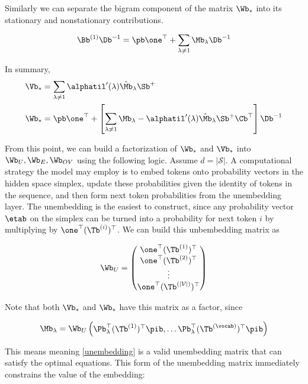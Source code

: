 \documentclass{article}
\begin{document}
Similarly we can separate the bigram component of the matrix $\Wb_*$ into its stationary and nonstationary contributions. 

\begin{equation}
    \Bb^{(1)}\Db^{-1} = \pb \one^\top + \sum_{\lambda\neq1}\Mb_\lambda\Db^{-1}
\end{equation}

In summary, 
\begin{align}
    \Vb_* &= \sum_{\lambda\neq 1} \alphatil'(\lambda) \hat{\Mb}_\lambda \Sb^+ \\
    \Wb_* &= \pb\one^\top + \left[\sum_{\lambda \neq 1} \Mb_\lambda - \alphatil'(\lambda) \hat{\Mb}_\lambda \Sb^{+}\Cb^\top\right] \Db^{-1}
\end{align}

From this point, we can build a factorization of $\Wb_*$ and $\Vb_*$ into $\Wb_U, \Wb_E, \Wb_{OV}$ using the following logic. Assume $d = |\mathcal{S}|$. A computational strategy the model may employ is to embed tokens onto probability vectors in the hidden space simplex, update these probabilities given the identity of tokens in the sequence, and then form next token probabilities from the unembedding layer. The unembedding is the easiest to construct, since any probability vector $\etab$ on the simplex can be turned into a probability for next token $i$ by multiplying by $\one^\top (\Tb^{(i)})^\top$. We can build this unbembedding matrix as 

\begin{equation}\label{unembedding}
    \Wb_U = \begin{pmatrix}
        \one^\top (\Tb^{(1)})^\top \\
        \one^\top (\Tb^{(2)})^\top \\
        \vdots\\
        \one^\top (\Tb^{(|\mathcal{V}|)})^\top
    \end{pmatrix}
\end{equation}

Note that both $\Vb_*$ and $\Wb_*$ have this matrix as a factor, since

\begin{equation}
    \Mb_\lambda = \Wb_U \begin{pmatrix}
        \Pb_\lambda^\top (\Tb^{(1)})^\top\pib, \dots
        \Pb_\lambda^\top (\Tb^{(\vocab)})^\top\pib
    \end{pmatrix}
\end{equation}

This means meaning \eqref{unembedding} is a valid unembedding matrix that can satisfy the optimal equations. This form of the unembedding matrix immediately constrains the value of the embedding:
\end{document}
